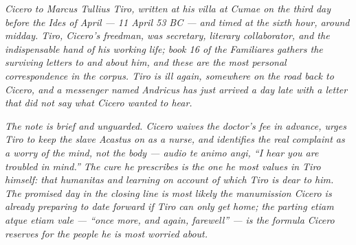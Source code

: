 
\textit{Cicero to Marcus Tullius Tiro, written at his villa at
Cumae on the third day before the Ides of April --- 11 April 53
BC --- and timed at the sixth hour, around midday. Tiro,
Cicero's freedman, was secretary, literary collaborator, and
the indispensable hand of his working life; book 16 of the
\textit{Familiares} gathers the surviving letters to and about
him, and these are the most personal correspondence in the
corpus. Tiro is ill again, somewhere on the road back to
Cicero, and a messenger named Andricus has just arrived a day
late with a letter that did not say what Cicero wanted to
hear.}

\textit{The note is brief and unguarded. Cicero waives the
doctor's fee in advance, urges Tiro to keep the slave Acastus
on as a nurse, and identifies the real complaint as a worry of
the mind, not the body --- \textit{audio te animo angi}, ``I
hear you are troubled in mind.'' The cure he prescribes is the
one he most values in Tiro himself: that humanitas and learning
on account of which Tiro is dear to him. The promised day in
the closing line is most likely the manumission Cicero is
already preparing to date forward if Tiro can only get home;
the parting \textit{etiam atque etiam vale} --- ``once more,
and again, farewell'' --- is the formula Cicero reserves for
the people he is most worried about.}
